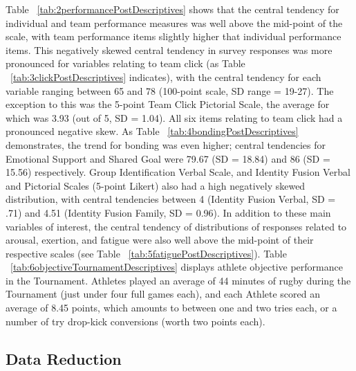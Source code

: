 Table ~\ref{tab:2performancePostDescriptives} shows that the central tendency for individual and team performance measures was well above the mid-point of the scale, with team performance items slightly higher that individual performance items.  This negatively skewed central tendency in survey responses was more pronounced for variables relating to team click (as Table ~\ref{tab:3clickPostDescriptives} indicates), with the central tendency for each variable ranging between 65 and 78 (100-point scale, SD range = 19-27). The exception to this was the 5-point Team Click Pictorial Scale, the average for which was 3.93 (out of 5, SD = 1.04).  All six items relating to team click had a pronounced negative skew.  As Table ~\ref{tab:4bondingPostDescriptives} demonstrates, the trend for bonding was even higher; central tendencies for Emotional Support and Shared Goal were 79.67 (SD = 18.84) and 86 (SD = 15.56) respectively.  Group Identification Verbal Scale, and Identity Fusion Verbal and Pictorial Scales (5-point Likert) also had a high negatively skewed distribution, with central tendencies between 4 (Identity Fusion Verbal, SD = .71) and 4.51 (Identity Fusion Family, SD = 0.96).
In addition to these main variables of interest, the central tendency of distributions of responses related to arousal, exertion, and fatigue were also well above the mid-point of their respective scales (see Table ~\ref{tab:5fatiguePostDescriptives}).  Table ~\ref{tab:6objectiveTournamentDescriptives} displays athlete objective performance in the Tournament. Athletes played an average of 44 minutes of rugby during the Tournament (just under four full games each), and each Athlete scored an average of 8.45 points, which amounts to between one and two tries each, or a number of try drop-kick conversions (worth two points each).








\subsection{Data Reduction}






